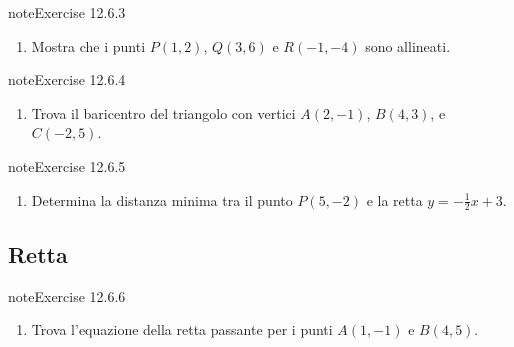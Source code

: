 \documentclass[letterpaper,10pt,italian]{jupyterBook}
\begin{document}
\begin{sphinxadmonition}{note}{Exercise 12.6.3}


\begin{enumerate}
%
\setcounter{enumi}{2}
\item {} 
\sphinxAtStartPar
Mostra che i punti \( P(1, 2) \), \( Q(3, 6) \) e \( R(-1, -4) \) sono allineati.

\end{enumerate}
\end{sphinxadmonition}
 \label{exercise:ch/analytic_geometry/analytic_geometry_2d/problems-exercise-3}

\begin{sphinxadmonition}{note}{Exercise 12.6.4}


\begin{enumerate}
%
\setcounter{enumi}{3}
\item {} 
\sphinxAtStartPar
Trova il baricentro del triangolo con vertici \( A(2, -1) \), \( B(4, 3) \), e \( C(-2, 5) \).

\end{enumerate}
\end{sphinxadmonition}
 \label{exercise:ch/analytic_geometry/analytic_geometry_2d/problems-exercise-4}

\begin{sphinxadmonition}{note}{Exercise 12.6.5}


\begin{enumerate}
%
\setcounter{enumi}{4}
\item {} 
\sphinxAtStartPar
Determina la distanza minima tra il punto \( P(5, -2) \) e la retta \( y = -\frac{1}{2}x + 3 \).

\end{enumerate}
\end{sphinxadmonition}


\subsection{Retta}
\label{\detokenize{ch/analytic_geometry/analytic_geometry_2d/problems:retta}} \label{exercise:ch/analytic_geometry/analytic_geometry_2d/problems-exercise-5}

\begin{sphinxadmonition}{note}{Exercise 12.6.6}


\begin{enumerate}
%
\setcounter{enumi}{5}
\item {} 
\sphinxAtStartPar
Trova l’equazione della retta passante per i punti \( A(1, -1) \) e \( B(4, 5) \).

\end{enumerate}
\end{sphinxadmonition}
 \label{exercise:ch/analytic_geometry/analytic_geometry_2d/problems-exercise-6}
\end{document}

